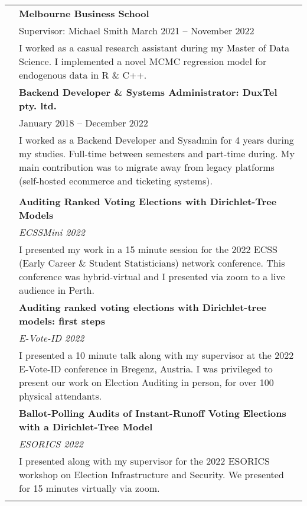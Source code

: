 \documentclass[letterpaper, 11pt]{article}
\begin{document}
\begin{longtable}{p{0.8in}p{5.4in}}
& \textbf{Melbourne Business School} \\
& Supervisor: Michael Smith \hfill March 2021 -- November 2022 \\
& I worked as a casual research assistant during my Master of Data Science. I implemented a novel MCMC regression model for endogenous data in R \& C++.\\

& \textbf{Backend Developer \& Systems Administrator: DuxTel pty. ltd. } \\
& \hfill January 2018 -- December 2022 \\
& I worked as a Backend Developer and Sysadmin for 4 years during my studies. Full-time between semesters and part-time during. My main contribution was to migrate away from legacy platforms (self-hosted ecommerce and ticketing systems).\\
& \\

\pagebreak

\color{OliveGreen}{Presentations}
& \textbf{Auditing Ranked Voting Elections with Dirichlet-Tree Models}\\
& \textit{ECSSMini 2022} \\
& I presented my work in a 15 minute session for the 2022 ECSS (Early Career \& Student Statisticians) network conference. This conference was hybrid-virtual and I presented via zoom to a live audience in Perth.\\
& \textbf{Auditing ranked voting elections with Dirichlet-tree models: first steps}\\
& \textit{E-Vote-ID 2022} \\
& I presented a 10 minute talk along with my supervisor at the 2022 E-Vote-ID conference in Bregenz, Austria. I was privileged to present our work on Election Auditing in person, for over 100 physical attendants.\\
& \textbf{Ballot-Polling Audits of Instant-Runoff Voting Elections with a Dirichlet-Tree Model}\\
& \textit{ESORICS 2022} \\
& I presented along with my supervisor for the 2022 ESORICS workshop on Election Infrastructure and Security. We presented for 15 minutes virtually via zoom.\\
& \\


\end{longtable}
\end{document}
